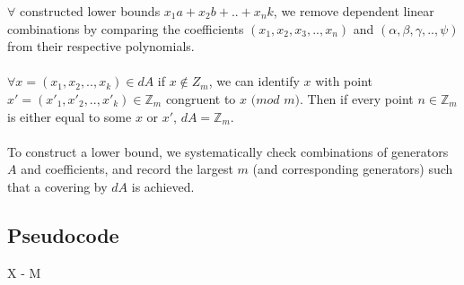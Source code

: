 $\forall$ constructed lower bounds $x_{1}a + x_{2}b + .. + x_{n}k$, we remove dependent linear combinations by comparing the coefficients $(x_{1}, x_{2}, x_{3}, .. , x_{n})$ and $(\alpha, \beta, \gamma, .. , \psi)$ from their respective polynomials.
\\ \\
$\forall x = (x_{1}, x_{2}, .. , x_{k}) \in dA$ if $x \notin Z_m$, we can identify $x$ with point $x' = (x'_{1}, x'_{2}, .. , x'_{k}) \in \mathbb{Z}_{m}$ congruent to $x$ $(mod$ $m)$.  Then if every point $n \in \mathbb{Z}_{m}$ is either equal to some $x$ or $x'$, $dA = \mathbb{Z}_m$. 
\\ \\
To construct a lower bound, we systematically check combinations of generators $A$ and coefficients, and record the largest $m$ (and corresponding generators) such that a covering by $dA$ is achieved.

\subsection{Pseudocode}

\begin{algorithmic}

\State X - M
\EndFor
\end{algorithmic}
